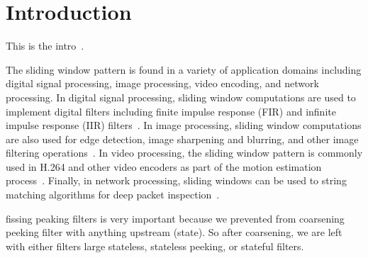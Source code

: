 \section{Introduction}
This is the intro~\cite{bakshi99}.

The sliding window pattern is found in a variety of application
domains including digital signal processing, image processing, video
encoding, and network processing.  In digital signal processing,
sliding window computations are used to implement digital filters
including finite impulse response (FIR) and infinite impulse response
(IIR) filters~\cite{NR92}.  In image processing, sliding window
computations are also used for edge detection, image sharpening and
blurring, and other image filtering
operations~\cite{Ziou97edgedetection}.  In video processing, the
sliding window pattern is commonly used in H.264 and other video
encoders as part of the motion estimation
process~\cite{Richardson03,BK97}.  Finally, in network processing,
sliding windows can be used to string matching algorithms for deep
packet inspection~\cite{Fisk02}.

fissing peaking filters is very important because we prevented from
coarsening peeking filter with anything upstream (state). So after
coarsening, we are left with either filters large stateless, stateless
peeking, or stateful filters.